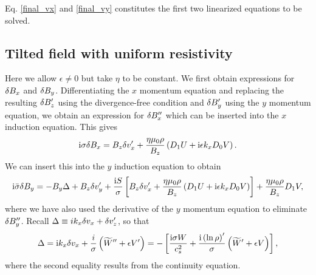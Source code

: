 Eq. \ref{final_vx} and \ref{final_vy} constitutes the first two
linearized equations to be solved.

\subsection{Tilted field with uniform resistivity}
Here we allow $\epsilon\neq 0$ but take $\eta$ to be constant. We
first obtain expressions for $\delta B_x$ and $\delta B_y$. Differentiating
the $x$ momentum equation and replacing the resulting $\delta B_z^\prime$
using the divergence-free condition and $\delta B_y^\prime$ using the $y$
momentum equation, we obtain an expression for $\delta B_x^{\prime\prime}$
which can be inserted into the $x$ induction equation. This gives
\begin{align}
  \mathrm{i}\sigma\delta B_x = B_z\delta v_x^\prime +
  \frac{\eta\mu_0\rho}{B_z}\left( D_1 U + \mathrm{i}\epsilon k_x D_0
  V\right).\label{bx_tilted}  
\end{align}
We can insert this into the $y$ induction equation to obtain
\begin{align}
  \mathrm{i}\bar{\sigma}\delta B_y = -B_y\Delta + B_z\delta v_y^\prime + \frac{\mathrm{i}
    S}{\sigma}\left[ B_z \delta v_x^\prime+ \frac{\eta\mu_0\rho}{B_z}\left( D_1 U + \mathrm{i}\epsilon k_x D_0
  V\right)\right] + \frac{\eta\mu_0\rho}{B_z}D_1V,\label{by_tilted}
\end{align} 
where we have also used the derivative of the $y$ momentum equation to
eliminate  $\delta B_y^{\prime\prime}$. Recall $\Delta \equiv i k_x \delta v_x +
\delta v_z^\prime$, so that
\begin{align}
  \Delta = \mathrm{i} k_x \delta v_x + \frac{i}{\sigma}\left(\widetilde{W}^{\prime\prime} +
  \epsilon V^\prime\right) = -\left[\frac{\mathrm{i}\sigma W}{c_s^2} +
    \frac{\mathrm{i}\left(\ln{\rho}\right)^\prime}{\sigma}\left(\widetilde{W}^\prime +
    \epsilon V\right)\right], 
\end{align}
where the second equality results from the continuity equation. 

